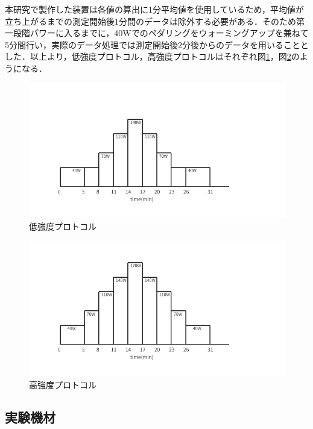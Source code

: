 本研究で製作した装置は各値の算出に1分平均値を使用しているため，平均値が立ち上がるまでの測定開始後1分間のデータは除外する必要がある．そのため第一段階パワーに入るまでに，40Wでのペダリングをウォーミングアップを兼ねて5分間行い，実際のデータ処理では測定開始後2分後からのデータを用いることとした．以上より，低強度プロトコル，高強度プロトコルはそれぞれ図\ref{fig:protocol_rampup_light}，図\ref{fig:protocol_rampup_hard}のようになる．

\begin{figure}[H]
  \begin{center}
    \includegraphics[width=12cm]{fig/protocol_rampup_light.pdf}
    \caption{低強度プロトコル}
    \label{fig:protocol_rampup_light}
  \end{center}
\end{figure}

\begin{figure}[H]
  \begin{center}
    \includegraphics[width=12cm]{fig/protocol_rampup_hard.pdf}
    \caption{高強度プロトコル}
    \label{fig:protocol_rampup_hard}
  \end{center}
\end{figure}

\subsection{実験機材}

